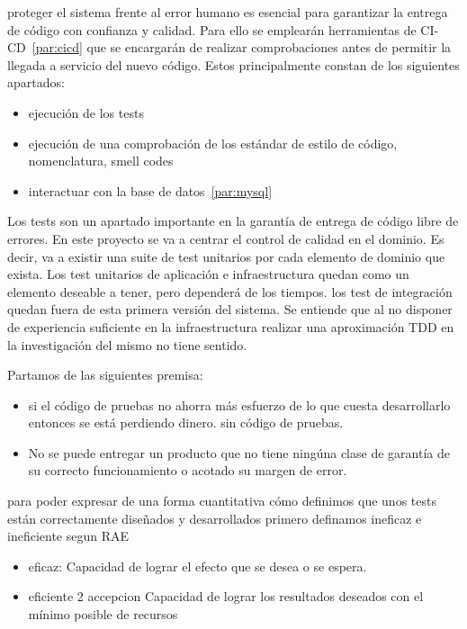 proteger el sistema frente al error humano es esencial para garantizar la entrega de código con confianza y calidad. Para ello se emplearán herramientas de CI-CD~\cref{par:cicd} que se encargarán de realizar comprobaciones antes de permitir la llegada a servicio del nuevo código. Estos principalmente constan de los siguientes apartados:

\begin{itemize}
    \item ejecución de los tests
    \item ejecución de una comprobación de los estándar de estilo de código, nomenclatura, smell codes
    \item interactuar con la base de datos~\cref{par:mysql}
\end{itemize}

Los tests son un apartado importante en la garantía de entrega de código libre de errores. En este proyecto se va a centrar el control de calidad en el dominio. Es decir, va a existir una suite de test unitarios por cada elemento de dominio que exista. Los test unitarios de aplicación e infraestructura quedan como un elemento deseable a tener, pero dependerá de los tiempos. los test de integración quedan fuera de esta primera versión del sistema. Se entiende que al no disponer de experiencia suficiente en la infraestructura realizar una aproximación TDD en la investigación del mismo no tiene sentido.

Partamos de las siguientes premisa:

\begin{itemize}
    \item si el código de pruebas no ahorra más esfuerzo de lo que cuesta desarrollarlo entonces se está perdiendo dinero.
    sin código de pruebas.
    \item No se puede entregar un producto que no tiene ningúna clase de garantía de su correcto funcionamiento o acotado su margen de error.
\end{itemize}

para poder expresar de una forma cuantitativa cómo definimos que unos tests están correctamente diseñados y desarrollados primero
definamos ineficaz e ineficiente segun RAE

\begin{itemize}
    \item eficaz: Capacidad de lograr el efecto que se desea o se espera.
    \item eficiente 2 accepcion Capacidad de lograr los resultados deseados con el mínimo posible de recursos
\end{itemize}

